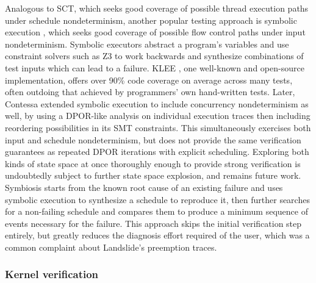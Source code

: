 Analogous to SCT,
which seeks good coverage of possible thread execution paths under schedule nondeterminism,
another popular testing approach is symbolic execution \cite{symbolic-execution},
which seeks good coverage of possible flow control paths under input nondeterminism.
Symbolic executors
abstract a program's variables and use constraint solvers such as Z3 \cite{z3}
to work backwards and synthesize combinations of test inputs which can lead to a failure.
%
KLEE \cite{klee}, one well-known and open-source implementation,
offers over 90\% code coverage on average across many tests,
often outdoing that achieved by programmers' own hand-written tests.
%
Later, Contessa \cite{contessa} extended symbolic execution to include concurrency nondeterminism as well,
by using a DPOR-like analysis on individual execution traces
then including reordering possibilities in its SMT constraints.
This simultaneously exercises both input and schedule nondeterminism,
but does not provide the same verification guarantees as repeated DPOR iterations with explicit scheduling.
Exploring both kinds of state space at once thoroughly enough to provide strong verification
is undoubtedly subject to further state space explosion,
and remains future work.
%
Symbiosis \cite{symbiosis} starts from the known root cause of an existing failure
and uses symbolic execution to synthesize a schedule to reproduce it,
then further searches for a non-failing schedule and compares them to produce
a minimum sequence of events necessary for the failure.
This approach skips the initial verification step entirely,
but greatly reduces the diagnosis effort required of the user,
which was a common complaint about Landslide's preemption traces.

\subsubsection{Kernel verification}

